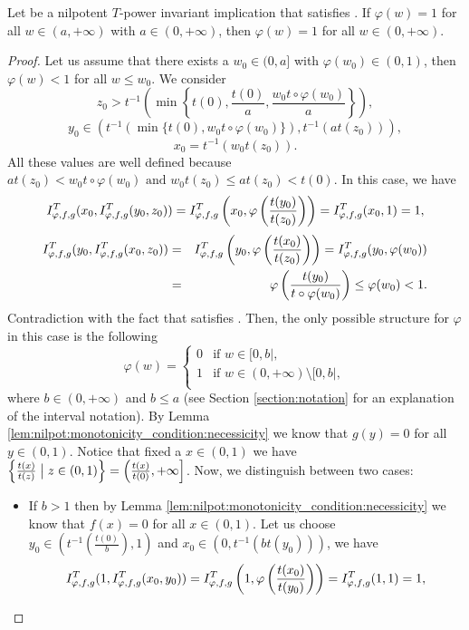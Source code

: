 \begin{lemma}\label{lem:nilpotent:(EP)ConstantZone1}
	Let \IT be a nilpotent $T$-power invariant implication that satisfies \EP. If $\varphi(w)=1$ for all $w \in (a,+\infty)$ with $a \in (0,+\infty)$, then $\varphi(w)=1$ for all $w \in (0,+\infty)$.
\end{lemma}
\begin{proof}
	Let us assume that there exists a $w_0 \in (0,a]$ with $\varphi(w_0) \in (0,1)$, then $\varphi(w) < 1$ for all $w \leq w_0$. We consider 
	$$z_0 > t^{-1} \left(\min \left \{ t(0), \frac{t(0)}{a}, \frac{w_0 t \circ \varphi(w_0)}{a}\right \}\right), $$
	$$y_0 \in \left(t^{-1}\left(\min \{t(0),w_0t \circ \varphi(w_0)\}\right), t^{-1}(at(z_0))\right), $$
	$$x_0=t^{-1}(w_0t(z_0)).$$ 
	All these values are well defined because $at(z_0)<w_0t\circ \varphi(w_0) \text{ and } w_0t(z_0) \leq at(z_0) < t(0)$. In this case, we have
	$$I^T_{\varphi,f,g}(x_0,I^T_{\varphi,f,g}(y_0,z_0)) = I^T_{\varphi,f,g} \left(x_0,\varphi \left(\frac{t(y_0)}{t(z_0)}\right)\right)=I^T_{\varphi,f,g}(x_0,1)=1,$$
	\begin{eqnarray*}
	I^T_{\varphi,f,g}(y_0,I^T_{\varphi,f,g}(x_0,z_0)) &=& I^T_{\varphi,f,g}\left(y_0,\varphi \left(\frac{t(x_0)}{t(z_0)}\right)\right) = I^T_{\varphi,f,g}(y_0,\varphi(w_0)) \\
	&=&\varphi \left(\frac{t(y_0)}{t \circ \varphi(w_0)}\right) \leq \varphi(w_0)<1.
	\end{eqnarray*}
	Contradiction with the fact that \IT satisfies \EP. Then, the only possible structure for $\varphi$ in this case is the following
	$$\varphi(w)
	=\left\{ \begin{array}{ll}
		0 &   \text{if }   w \in [0,b|, \\
		1 &  \text{if }  w \in (0,+\infty) \setminus [0,b|, \\
	\end{array}
	\right.
	$$
	where $b \in (0,+\infty)$ and $b \leq a$ (see Section \ref{section:notation} for an explanation of the interval notation). By Lemma \ref{lem:nilpot:monotonicity_condition:necessicity} we know that $g(y)=0$ for all $y \in (0,1)$.  Notice that fixed a $x \in (0,1)$ we have $\left \{ \frac{t(x)}{t(z)} \bigm| z \in (0,1)\right \} = \left(\frac{t(x)}{t(0)},+\infty \right ]$.
	Now, we distinguish between two cases:
	\begin{itemize}
		\item If $b > 1$ then by Lemma \ref{lem:nilpot:monotonicity_condition:necessicity} we know that $f(x)=0$ for all $x \in (0,1)$. Let us choose $y_0 \in \left(t^{-1} \left(\frac{t(0)}{b}\right),1 \right)$ and $x_0 \in (0,t^{-1}(bt(y_0)))$, we have
		$$I^T_{\varphi,f,g}(1,I^T_{\varphi,f,g}(x_0,y_0))=I^T_{\varphi,f,g}\left(1,\varphi \left(\frac{t(x_0)}{t(y_0)}\right)\right) = I^T_{\varphi,f,g}(1,1)=1,$$

\end{itemize}
\end{proof}
